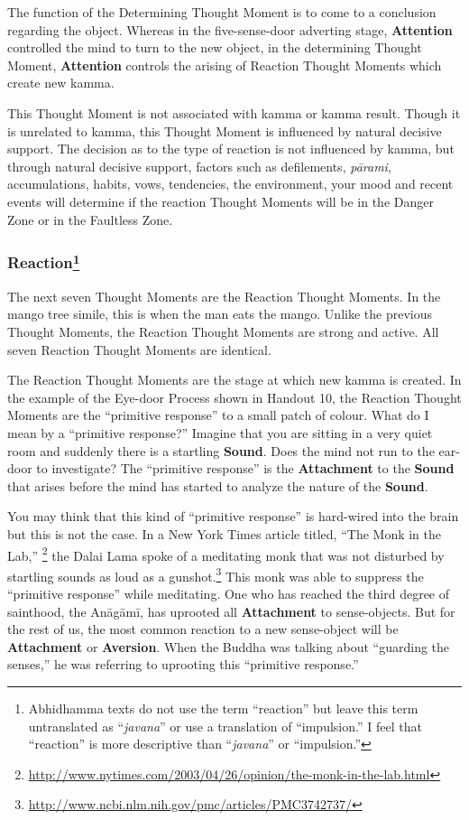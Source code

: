 The function of the Determining Thought Moment is to come to a conclusion regarding the object. Whereas in the five-sense-door adverting stage, \textbf{Attention} controlled the mind to turn to the new object, in the determining Thought Moment, \textbf{Attention} controls the arising of Reaction Thought Moments which create new kamma.

This Thought Moment is not associated with kamma or kamma result. Though it is unrelated to kamma, this Thought Moment is influenced by natural decisive support. The decision as to the type of reaction is not influenced by kamma, but through natural decisive support, factors such as defilements, \textit{pārami}, accumulations, habits, vows, tendencies, the environment, your mood and recent events will determine if the reaction Thought Moments will be in the Danger Zone or in the Faultless Zone.

\subsubsection*{Reaction\footnote{Abhidhamma texts do not use the term “reaction” but leave this term untranslated as “\textit{javana}” or use a translation of “impulsion.” I feel that “reaction” is more descriptive than “\textit{javana}” or “impulsion.”}}

The next seven Thought Moments are the Reaction Thought Moments. In the mango tree simile, this is when the man eats the mango. Unlike the previous Thought Moments, the Reaction Thought Moments are strong and active. All seven Reaction Thought Moments are identical.

The Reaction Thought Moments are the stage at which new kamma is created. In the example of the Eye-door Process shown in Handout 10, the Reaction Thought Moments are the “primitive response” to a small patch of colour. What do I mean by a “primitive response?” Imagine that you are sitting in a very quiet room and suddenly there is a startling \textbf{Sound}. Does the mind not run to the ear-door to investigate? The “primitive response” is the \textbf{Attachment} to the \textbf{Sound} that arises before the mind has started to analyze the nature of the \textbf{Sound}.

You may think that this kind of “primitive response” is hard-wired into the brain but this is not the case. In a New York Times article titled, “The Monk in the Lab,” \footnote{\url{http://www.nytimes.com/2003/04/26/opinion/the-monk-in-the-lab.html}} the Dalai Lama spoke of a meditating monk that was not disturbed by startling sounds as loud as a gunshot.\footnote{\url{http://www.ncbi.nlm.nih.gov/pmc/articles/PMC3742737/}} This monk was able to suppress the “primitive response” while meditating. One who has reached the third degree of sainthood, the Anāgāmī, has uprooted all \textbf{Attachment} to sense-objects. But for the rest of us, the most common reaction to a new sense-object will be \textbf{Attachment} or \textbf{Aversion}. When the Buddha was talking about “guarding the senses,” he was referring to uprooting this “primitive response.”

